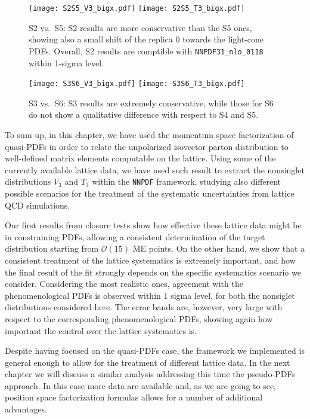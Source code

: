 \begin{figure}[h]
    \begin{center}
    \texttt{[image: S2S5\_V3\_bigx.pdf]}  
	\texttt{[image: S2S5\_T3\_bigx.pdf]}  
	\caption{S2 vs.\ S5: S2 results are more conservative than the S5 ones,
        showing also a small shift of the replica 0 towards the light-cone PDFs.
        Overall, S2 results are comptible with {\tt NNPDF31\_nlo\_0118} within
        1-sigma level.}
    \label{fig:5}
    \end{center}
\end{figure}

\begin{figure}[h]
    \begin{center}
	\texttt{[image: S3S6\_V3\_bigx.pdf]}  
	\texttt{[image: S3S6\_T3\_bigx.pdf]}  
	\caption{S3 vs.\ S6: S3 results are extremely conservative, while those for S6
        do not show a qualitative difference with respect to S4 and S5.}
    \label{fig:6}
    \end{center}
\end{figure}


To sum up, in this chapter, we have used the momentum space factorization of quasi-PDFs in order to relate
the unpolarized isovector parton distribution to well-defined matrix elements
computable on the lattice. Using some of the currently available lattice data,
we have used such result to extract the nonsinglet distributions $V_3$ and $T_3$
within the {\tt NNPDF} framework, studying also different possible scenarios for
the treatment of the systematic uncertainties from lattice QCD simulations.

Our first results from closure tests show how effective these lattice data might
be in constraining PDFs, allowing a consistent determination of the target
distribution starting from $\mathcal{O}\left(15\right)$ ME points. On the other
hand, we show that a consistent treatment of the lattice systematics is
extremely important, and how the final result of the fit strongly depends on the
specific systematics scenario we consider. Considering the most realistic ones,
agreement with the phenomenological PDFs is observed within 1 sigma level, for
both the nonsiglet distributions considered here. The error bands are, however,
very large with respect to the corresponding phenomenological PDFs, showing again how
important the control over the lattice systematics is. 

Despite having focused on the quasi-PDFs case, the framework we
implemented is general enough to allow for the treatment of different lattice data. 
In the next chapter we will discuss a similar analysis addressing this time the pseudo-PDFs 
approach. In this case more data are available and, as we are going to see, 
position space factorization formulas allows for a number of additional advantages.






